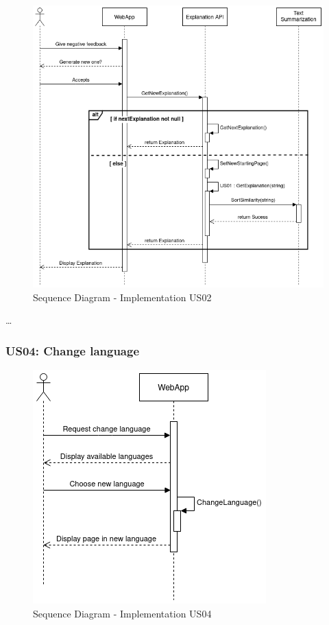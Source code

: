 \begin{figure}[H]
\centering
\includegraphics[scale=0.45]{ch5/assets/US02_SD_Implement.png}
\caption[Sequence Diagram Implementation US02]{Sequence Diagram - Implementation US02}
\label{fig:uc02Imp}
\end{figure}

\dots %

\subsubsection{US04: Change language}

\begin{figure}[H]
\centering
\includegraphics[scale=0.45]{ch5/assets/US04_SD_Implement.png}
\caption[Sequence Diagram Implementation US04]{Sequence Diagram - Implementation US04}
\label{fig:uc04Imp}
\end{figure}

